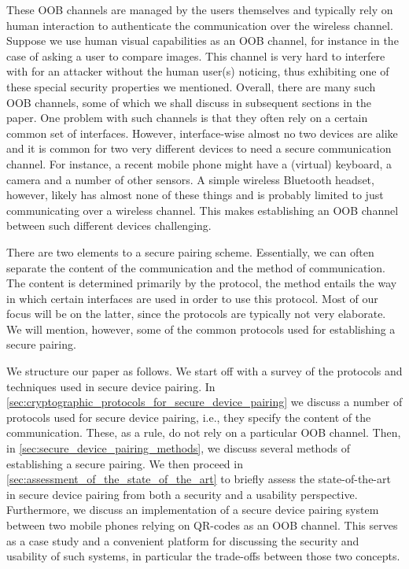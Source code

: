 \documentclass[conference, 11pt]{sty/IEEEtran}
\begin{document}
These OOB channels are managed by the users themselves and typically rely on human interaction to authenticate the communication over the wireless channel.
Suppose we use human visual capabilities as an OOB channel, for instance in the case of asking a user to compare images.
This channel is very hard to interfere with for an attacker without the human user(s) noticing, thus exhibiting one of these special security properties we mentioned.
Overall, there are many such OOB channels, some of which we shall discuss in subsequent sections in the paper.
One problem with such channels is that they often rely on a certain common set of interfaces.
However, interface-wise almost no two devices are alike and it is common for two very different devices to need a secure communication channel.
For instance, a recent mobile phone might have a (virtual) keyboard, a camera and a number of other sensors.
A simple wireless Bluetooth headset, however, likely has almost none of these things and is probably limited to just communicating over a wireless channel.
This makes establishing an OOB channel between such different devices challenging.

There are two elements to a secure pairing scheme.
Essentially, we can often separate the content of the communication and the method of communication.
The content is determined primarily by the protocol, the method entails the way in which certain interfaces are used in order to use this protocol.
Most of our focus will be on the latter, since the protocols are typically not very elaborate.
We will mention, however, some of the common protocols used for establishing a secure pairing.

We structure our paper as follows.
We start off with a survey of the protocols and techniques used in secure device pairing.
In \autoref{sec:cryptographic_protocols_for_secure_device_pairing} we discuss a number of protocols used for secure device pairing, i.e., they specify the content of the communication.
These, as a rule, do not rely on a particular OOB channel.
Then, in \autoref{sec:secure_device_pairing_methods}, we discuss several methods of establishing a secure pairing.
We then proceed in \autoref{sec:assessment_of_the_state_of_the_art} to briefly assess the state-of-the-art in secure device pairing from both a security and a usability perspective.
Furthermore, we discuss an implementation of a secure device pairing system between two mobile phones relying on QR-codes as an OOB channel.
This serves as a case study and a convenient platform for discussing the security and usability of such systems, in particular the trade-offs between those two concepts.
\end{document}
